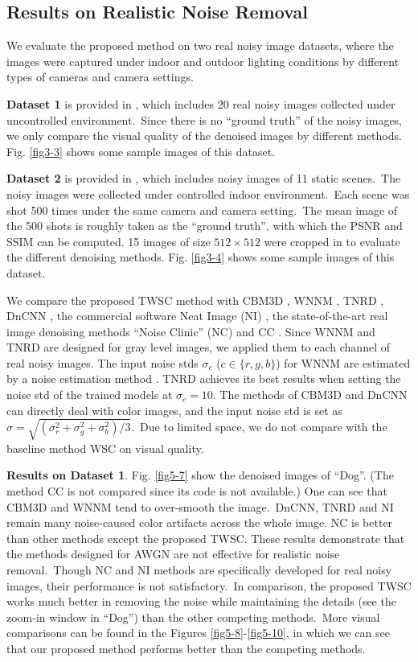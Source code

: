 \subsection{Results on Realistic Noise Removal}


We evaluate the proposed method on two real noisy image datasets, where the images were captured under indoor and outdoor lighting conditions by different types of cameras and camera settings. 

\textbf{Dataset 1} is provided in \cite{ncwebsite}, which includes 20 real noisy images collected under uncontrolled environment.\ Since there is no ``ground truth'' of the noisy images, we only compare the visual quality of the denoised images by different methods. Fig. \ref{fig3-3} shows some sample images of this dataset.

\textbf{Dataset 2} is provided in \cite{crosschannel2016}, which includes noisy images of 11 static scenes.\ The noisy images were collected under controlled indoor environment.\ Each scene was shot 500 times under the same camera and camera setting.\ The mean image of the 500 shots is roughly taken as the ``ground truth'', with which the PSNR and SSIM \cite{ssim} can be computed. 15 images of size $512\times512$ were cropped in \cite{crosschannel2016} to evaluate the different denoising methods. Fig. \ref{fig3-4} shows some sample images of this dataset.


We compare the proposed TWSC method with CBM3D \cite{cbm3d}, WNNM \cite{wnnm}, TNRD \cite{tnrd}, DnCNN \cite{dncnn}, the commercial software Neat Image (NI) \cite{neatimage}, the state-of-the-art real image denoising methods ``Noise Clinic'' (NC) \cite{noiseclinic} and CC \cite{crosschannel2016}. Since WNNM and TNRD are designed for gray level images, we applied them to each channel of real noisy images. The input noise stds $\sigma_{c}$ ($c\in\{r,g,b\}$) for WNNM are estimated by a noise estimation method \cite{Chen2015ICCV}. TNRD achieves its best results when setting the noise std of the trained models at $\sigma_{c}=10$. The methods of CBM3D and DnCNN can directly deal with color images, and the input noise std is set as $\sigma=\sqrt{(\sigma_{r}^{2}+\sigma_{g}^{2}+\sigma_{b}^{2})/3}$.\ Due to limited space, we do not compare with the baseline method WSC on visual quality.

\textbf{Results on Dataset 1}. Fig. \ref{fig5-7} show the denoised images of ``Dog''. (The method CC \cite{crosschannel2016} is not compared since its code is not available.) One can see that CBM3D and WNNM tend to over-smooth the image.\ DnCNN, TNRD and NI remain many noise-caused color artifacts across the whole image. NC is better than other methods except the proposed TWSC. These results demonstrate that the methods designed for AWGN are not effective for realistic noise removal.\ Though NC and NI methods are specifically developed for real noisy images, their performance is not satisfactory.\ In comparison, the proposed TWSC works much better in removing the noise while maintaining the details (see the zoom-in window in ``Dog'') than the other competing methods.\ More visual comparisons can be found in the Figures \ref{fig5-8}-\ref{fig5-10}, in which we can see that our proposed method performs better than the competing methods.

